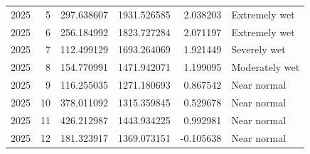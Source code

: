 \begin{tabular}{rrrrrl}
2025 & 5 & 297.638607 & 1931.526585 & 2.038203 & Extremely wet \\
2025 & 6 & 256.184992 & 1823.727284 & 2.071197 & Extremely wet \\
2025 & 7 & 112.499129 & 1693.264069 & 1.921449 & Severely wet \\
2025 & 8 & 154.770991 & 1471.942071 & 1.199095 & Moderately wet \\
2025 & 9 & 116.255035 & 1271.180693 & 0.867542 & Near normal \\
2025 & 10 & 378.011092 & 1315.359845 & 0.529678 & Near normal \\
2025 & 11 & 426.212987 & 1443.934225 & 0.992981 & Near normal \\
2025 & 12 & 181.323917 & 1369.073151 & -0.105638 & Near normal \\
\bottomrule
\end{tabular}
